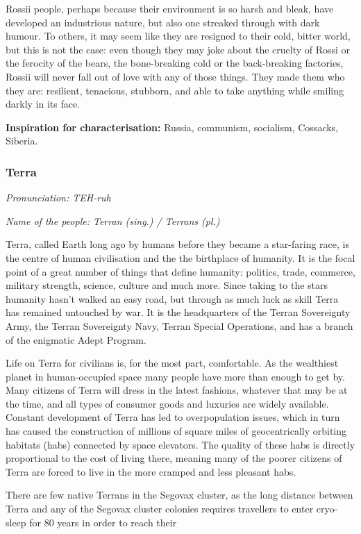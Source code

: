 Rossii people, perhaps because their environment is so harsh and bleak, have developed an industrious nature, but also one streaked through with dark humour. To others, it may seem like they are resigned to their cold, bitter world, but this is not the case: even though they may joke about the cruelty of Rossi or the ferocity of the bears, the bone-breaking cold or the back-breaking factories, Rossii will never fall out of love with any of those things. They made them who they are: resilient, tenacious, stubborn, and able to take anything while smiling darkly in its face.

\textbf{Inspiration for characterisation:} Russia, communism, socialism, Cossacks, Siberia.

\subsubsection{Terra}

\textit{Pronunciation: TEH-ruh}

\textit{Name of the people: Terran (sing.) / Terrans (pl.)}

Terra, called Earth long ago by humans before they became a star-faring race, is the centre of human civilisation and the the birthplace of humanity. It is the focal point of a great number of things that define humanity: politics, trade, commerce, military strength, science, culture and much more. Since taking to the stars humanity hasn't walked an easy road, but through as much luck as skill Terra has remained untouched by war. It is the headquarters of the Terran Sovereignty Army, the Terran Sovereignty Navy, Terran Special Operations, and has a branch of the enigmatic Adept Program.

Life on Terra for civilians is, for the most part, comfortable. As the wealthiest planet in human-occupied space many people have more than enough to get by. Many citizens of Terra will dress in the latest fashions, whatever that may be at the time, and all types of consumer goods and luxuries are widely available. Constant development of Terra has led to overpopulation issues, which in turn has caused the construction of millions of square miles of geocentrically orbiting habitats (habs) connected by space elevators. The quality of these habs is directly proportional to the cost of living there, meaning many of the poorer citizens of Terra are forced to live in the more cramped and less pleasant habs.

There are few native Terrans in the Segovax cluster, as the long distance between Terra and any of the Segovax cluster colonies requires travellers to enter cryo-sleep for 80 years in order to reach their

